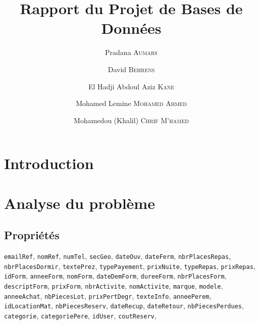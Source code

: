 \documentclass[12pt, a4paper]{article}
\title{Rapport du Projet de Bases de Données}
\author{Pradana \textsc{Aumars}
  \and
  David \textsc{Behrens}
  \and
  El Hadji Abdoul Aziz \textsc{Kane}
  \and
  Mohamed Lemine \textsc{Mohamed Ahmed}
  \and
  Mohamedou (Khalil) \textsc{Chrif M'hamed}}
\newcommand\att[1]{\textnhtt{#1}}
\begin{document}
\maketitle
\section{Introduction}
\section{Analyse du problème}
\subsection*{Propriétés}
\att{emailRef}, %
\att{nomRef}, %
\att{numTel}, %
\att{secGeo}, %
\att{dateOuv}, %
\att{dateFerm}, %
\att{nbrPlacesRepas}, %
\att{nbrPlacesDormir}, %
\att{textePrez}, %
\att{typePayement}, %
\att{prixNuite}, %
\att{typeRepas}, %
\att{prixRepas}, %
\att{idForm}, %
\att{anneeForm}, %
\att{nomForm}, %
\att{dateDemForm}, %
\att{dureeForm}, %
\att{nbrPlacesForm}, %
\att{descriptForm}, %
\att{prixForm}, %
\att{nbrActivite}, %
\att{nomActivite}, %
\att{marque}, %
\att{modele}, %
\att{anneeAchat}, %
\att{nbPiecesLot}, %
\att{prixPertDegr}, %
\att{texteInfo}, %
\att{anneePerem}, %
\att{idLocationMat}, %
\att{nbPiecesReserv}, %
\att{dateRecup},
\att{dateRetour},
\att{nbPiecesPerdues},
\att{categorie}, %
\att{categoriePere}, %
\att{idUser}, %
\att{coutReserv},
\end{document}
